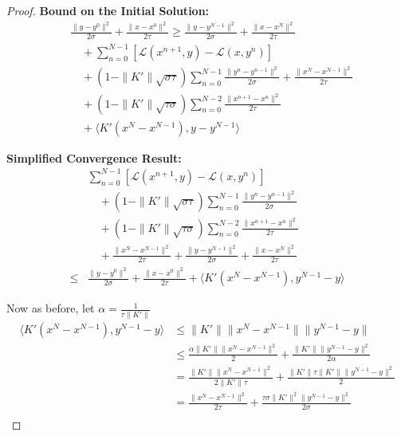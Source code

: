 \documentclass[twoside,12pt,openright]{report}  %
\begin{document}
\begin{proof}
\noindent\textbf{Bound on the Initial Solution:}
\begin{align*}
&\frac{\|y - y^{0}\|^2}{2\sigma} + \frac{\|x - x^0\|^2}{2\tau} \ge \frac{\|y - y^{N-1}\|^2}{2\sigma} + \frac{\|x - x^N\|^2}{2\tau} \\
&\quad + \sum_{n=0}^{N-1} \left[ \mathcal{L}(x^{n+1},y)- \mathcal{L}(x,y^n) \right] \\
&\quad + (1 - \|K'\|\sqrt{\sigma\tau}) \sum_{n=0}^{N-1} \frac{\|y^n - y^{n-1}\|^2}{2\sigma} + \frac{\|x^N - x^{N-1}\|^2}{2\tau} \\
&\quad + (1 - \|K'\|\sqrt{\tau\sigma}) \sum_{n=0}^{N-2} \frac{\|x^{n+1} - x^n\|^2}{2\tau} \\
&\quad + \langle K'(x^N - x^{N-1}), y - y^{N-1} \rangle
\end{align*}

\noindent\textbf{Simplified Convergence Result:}
\begin{align*}
&\sum_{n=0}^{N-1} \left[ \mathcal{L}(x^{n+1},y)- \mathcal{L}(x,y^n) \right] \\
&\quad + (1 - \|K'\|\sqrt{\sigma\tau}) \sum_{n=0}^{N-1} \frac{\|y^n - y^{n-1}\|^2}{2\sigma} \\
&\quad + (1 - \|K'\|\sqrt{\tau\sigma}) \sum_{n=0}^{N-2} \frac{\|x^{n+1} - x^n\|^2}{2\tau} \\
&\quad + \frac{\|x^N - x^{N-1}\|^2}{2\tau} + \frac{\|y - y^{N-1}\|^2}{2\sigma} + \frac{\|x - x^N\|^2}{2\tau}\\
\leq{}& \frac{\|y - y^{0}\|^2}{2\sigma} + \frac{\|x - x^0\|^2}{2\tau} + \langle K'(x^N - x^{N-1}), y^{N-1} - y \rangle
\end{align*}

Now as before, let \(\alpha=\frac{1}{\tau\|K'\|}\)
\[
    \begin{aligned}
    \langle K'(x^N - x^{N-1}), y^{N-1} - y \rangle &\le \|K'\|\|x^N - x^{N-1}\|\|y^{N-1} - y\|\\
    &\le \frac{\alpha\|K'\|\|x^N - x^{N-1}\|^2}{2} +\frac{\|K'\|\|y^{N-1} - y\|^2}{2\alpha}\\
    &= \frac{\|K'\|\|x^N - x^{N-1}\|^2}{2\|K'\|\tau} +\frac{\|K'\|\tau\|K'\|\|y^{N-1} - y\|^2}{2}\\
    &= \frac{\|x^N - x^{N-1}\|^2}{2\tau} +\frac{\tau\sigma\|K'\|^2\|y^{N-1} - y\|^2}{2\sigma}\\
\end{aligned}
\]


\end{proof}
\end{document}
